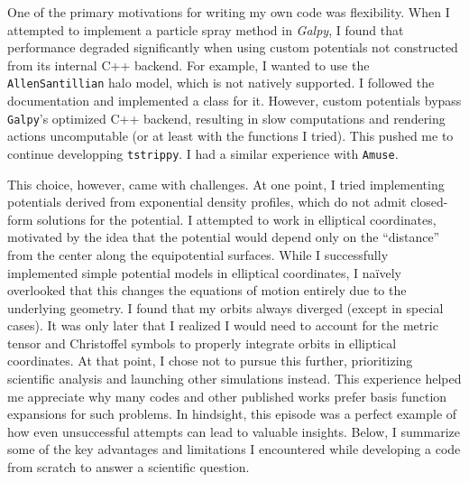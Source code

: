         One of the primary motivations for writing my own code was flexibility. When I attempted to implement a particle spray method in \textit{Galpy}, I found that performance degraded significantly when using custom potentials not constructed from its internal C++ backend. For example, I wanted to use the \texttt{AllenSantillian} halo model, which is not natively supported. I followed the documentation and implemented a class for it. However, custom potentials bypass \texttt{Galpy}'s optimized C++ backend, resulting in slow computations and rendering actions uncomputable (or at least with the functions I tried). This pushed me to continue developping \texttt{tstrippy}. I had a similar experience with \texttt{Amuse}.

        This choice, however, came with challenges. At one point, I tried implementing potentials derived from exponential density profiles, which do not admit closed-form solutions for the potential. I attempted to work in elliptical coordinates, motivated by the idea that the potential would depend only on the ``distance'' from the center along the equipotential surfaces. While I successfully implemented simple potential models in elliptical coordinates, I naïvely overlooked that this changes the equations of motion entirely due to the underlying geometry. I found that my orbits always diverged (except in special cases). It was only later that I realized I would need to account for the metric tensor and Christoffel symbols to properly integrate orbits in elliptical coordinates. At that point, I chose not to pursue this further, prioritizing scientific analysis and launching other simulations instead. This experience helped me appreciate why many codes and other published works prefer basis function expansions for such problems. In hindsight, this episode was a perfect example of how even unsuccessful attempts can lead to valuable insights. Below, I summarize some of the key advantages and limitations I encountered while developing a code from scratch to answer a scientific question.

